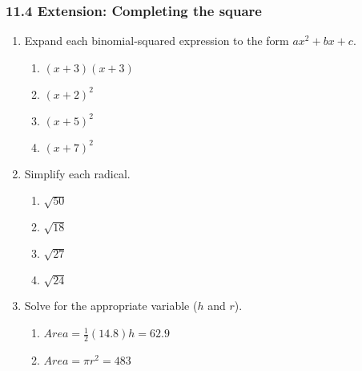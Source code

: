 

\fancyhead[LE]{\thepage}



\subsubsection*{11.4 Extension: Completing the square}
  \begin{enumerate}
\item Expand each binomial-squared expression to the form $ax^2+bx+c$.
  \begin{multicols}{2}
  \begin{enumerate}[itemsep=3cm]
    \item $(x+3)(x+3)$
    \item $(x+2)^2$ 
    \item $(x+5)^2$ 
    \item $(x+7)^2$ 
  \end{enumerate}
  \end{multicols}\vspace{3cm}
  
\item Simplify each radical.
\begin{multicols}{2}
  \begin{enumerate}[itemsep=2cm]
    \item $\sqrt{50}$ 
    \item $\sqrt{18}$
    \item $\sqrt{27}$ 
    \item $\sqrt{24}$ 
  \end{enumerate}
  \end{multicols}\vspace{2cm}

\item Solve for the appropriate variable ($h$ and $r$).
  \begin{multicols}{2}
  \begin{enumerate}[itemsep=2cm]
    \item $Area=\frac{1}{2}(14.8)h=62.9$ 
    \item $Area=\pi r^2=483$ 
  \end{enumerate}
  \end{multicols}\vspace{2cm}


\end{enumerate}
